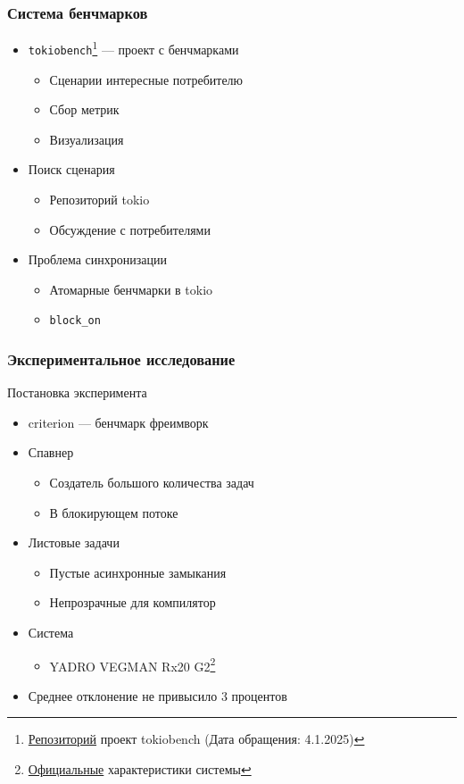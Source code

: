 \documentclass{beamer}
\begin{document}
\begin{frame}[fragile]
  \frametitle{Система бенчмарков}
  \begin{itemize}
    \item \verb|tokiobench|\footnote{\href{https://github.com/IgorErin/tokiobench}{Репозиторий} проект tokiobench (Дата обращения: 4.1.2025)} --- проект с бенчмарками
    \begin{itemize}
    \item Сценарии интересные потребителю
    \item Сбор метрик
    \item Визуализация
    \end{itemize}
    \item Поиск сценария
    \begin{itemize}
      \item Репозиторий tokio
      \item Обсуждение с потребителями
    \end{itemize}
    \item Проблема синхронизации
    \begin{itemize}
      \item Атомарные бенчмарки в tokio
      \item \verb|block_on|
    \end{itemize}
  \end{itemize}
\end{frame}

\begin{frame}[fragile]
  \frametitle{Экспериментальное исследование}
  Постановка эксперимента
  \begin{itemize}
    \item criterion --- бенчмарк фреимворк
    \item Спавнер
    \begin{itemize}
      \item Создатель большого количества задач
      \item В блокирующем потоке
    \end{itemize}
    \item Листовые задачи
    \begin{itemize}
      \item Пустые асинхронные замыкания
      \item Непрозрачные для компилятор
    \end{itemize}
    \item Система
    \begin{itemize}
      \item YADRO VEGMAN Rx20 G2\footnote{\href{https://yadro.com/ru/vegman/rx20g2/specs}{Официальные} характеристики системы}
    \end{itemize}
    \item Среднее отклонение не привысило 3 процентов
  \end{itemize}
\end{frame}
\end{document}
